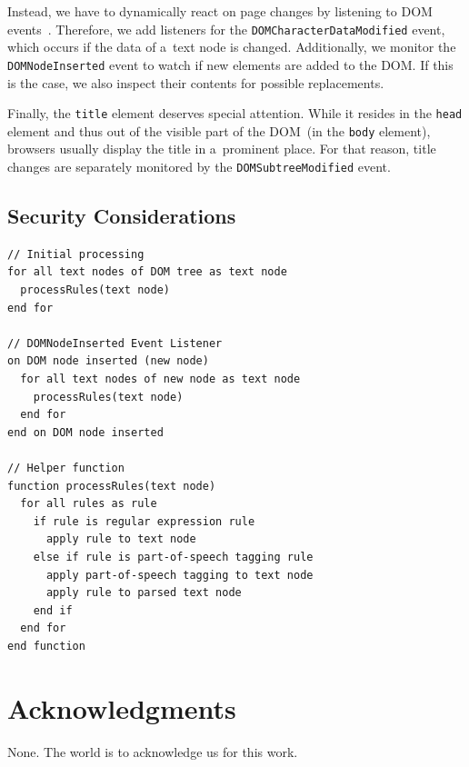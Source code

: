 \documentclass{acm_proc_article-sp}
\newcommand{\inlinelistingsize}{\fontsize{8pt}{11pt}}
\let\oldttdefault\ttdefault
\renewcommand{\ttdefault}{pcr}
\let\oldurl\url
\renewcommand{\url}[1]{\inlinelistingsize\oldurl{#1}}
\begin{document}
Instead, we have to dynamically react on page changes by listening to DOM events~\cite{w3cevents2011}.
Therefore, we add listeners for the \Verb!DOMCharacterDataModified! event, which occurs if the data of a~text node is changed.
Additionally, we monitor the \Verb!DOMNodeInserted! event to watch if new elements are added to the DOM.
If this is the case, we also inspect their contents for possible replacements.

Finally, the \Verb!title! element deserves special attention.
While it resides in the \Verb!head! element and thus out of the visible part of the DOM~(in the \Verb!body! element),
browsers usually display the title in a~prominent place.
For that reason, title changes are separately monitored by the \Verb!DOMSubtreeModified! event.

\subsection{Security Considerations}

\begin{lstlisting}[caption=Pseudocode illustrating the browser extension's functionality., label=code:xkcd, float=h, escapechar=§, belowskip=-1em]
// Initial processing
for all text nodes of DOM tree as text node
  processRules(text node)
end for  

// DOMNodeInserted Event Listener
on DOM node inserted (new node)
  for all text nodes of new node as text node
    processRules(text node)
  end for  
end on DOM node inserted

// Helper function
function processRules(text node)
  for all rules as rule
    if rule is regular expression rule
      apply rule to text node
    else if rule is part-of-speech tagging rule
      apply part-of-speech tagging to text node
      apply rule to parsed text node
    end if
  end for
end function  
\end{lstlisting} 

\section{Acknowledgments}
None. The world is to acknowledge us for this work.

\let\ttdefault\oldttdefault
\let\url\oldurl




\balancecolumns
\end{document}
